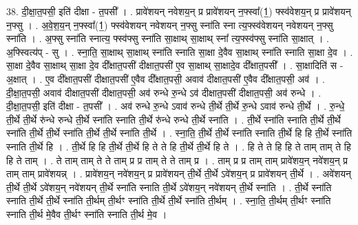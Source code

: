 \documentclass[17pt]{extarticle}
\begin{document}
38. दी॒क्षा॒त॒पसी॒ इति॑ दीक्षा - त॒पसी᳚ । . प्रावे॑शयन् नवेशय॒न् प्र प्रावे॑शयन् न॒फ्स्वा᳚(1॒) फ्स्व॑वेशय॒न् प्र प्रावे॑शयन् न॒फ्सु । . अ॒वे॒श॒य॒न् न॒फ्स्वा᳚(1॒) फ्स्व॑वेशयन्  नवेशयन् न॒फ्सु स्ना॑ति स्ना त्य॒फ्स्व॑वेशयन् नवेशयन् न॒फ्सु स्ना॑ति । . अ॒फ्सु स्ना॑ति स्नात्य॒ फ्स्व॑फ्सु स्ना॑ति सा॒क्षाथ् सा॒क्षाथ् स्ना᳚ त्य॒फ्स्व॑फ्सु स्ना॑ति सा॒क्षात् । . अ॒फ्स्वित्य॑प् - सु । . स्ना॒ति॒ सा॒क्षाथ् सा॒क्षाथ् स्ना॑ति स्नाति सा॒क्षा दे॒वैव सा॒क्षाथ् स्ना॑ति स्नाति सा॒क्षा दे॒व । . सा॒क्षा दे॒वैव सा॒क्षाथ् सा॒क्षा दे॒व दी᳚क्षात॒पसी॑ दीक्षात॒पसी॑ ए॒व सा॒क्षाथ् सा॒क्षादे॒व दी᳚क्षात॒पसी᳚ । . सा॒क्षादिति॑ स - अ॒क्षात् । . ए॒व दी᳚क्षात॒पसी॑ दीक्षात॒पसी॑ ए॒वैव दी᳚क्षात॒पसी॒ अवाव॑ दीक्षात॒पसी॑ ए॒वैव दी᳚क्षात॒पसी॒ अव॑ । . दी॒क्षा॒त॒पसी॒ अवाव॑ दीक्षात॒पसी॑ दीक्षात॒पसी॒ अव॑ रुन्धे रु॒न्धे ऽव॑ दीक्षात॒पसी॑ दीक्षात॒पसी॒ अव॑ रुन्धे । . दी॒क्षा॒त॒पसी॒ इति॑ दीक्षा - त॒पसी᳚ । . अव॑ रुन्धे रु॒न्धे ऽवाव॑ रुन्धे ती॒र्थे ती॒र्थे रु॒न्धे ऽवाव॑ रुन्धे ती॒र्थे । . रु॒न्धे॒ ती॒र्थे ती॒र्थे रु॑न्धे रुन्धे ती॒र्थे स्ना॑ति स्नाति ती॒र्थे रु॑न्धे रुन्धे ती॒र्थे स्ना॑ति । . ती॒र्थे स्ना॑ति स्नाति ती॒र्थे ती॒र्थे स्ना॑ति ती॒र्थे ती॒र्थे स्ना॑ति ती॒र्थे ती॒र्थे स्ना॑ति ती॒र्थे । . स्ना॒ति॒ ती॒र्थे ती॒र्थे स्ना॑ति स्नाति ती॒र्थे हि हि ती॒र्थे स्ना॑ति स्नाति ती॒र्थे हि । . ती॒र्थे हि हि ती॒र्थे ती॒र्थे हि ते ते हि ती॒र्थे ती॒र्थे हि ते । . हि ते ते हि हि ते ताम् ताम् ते हि हि ते ताम् । . ते ताम् ताम् ते ते ताम् प्र प्र ताम् ते ते ताम् प्र । . ताम् प्र प्र ताम् ताम् प्रावे॑शय॒न् नवे॑शय॒न् प्र ताम् ताम् प्रावे॑शयन्न् । . प्रावे॑शय॒न् नवे॑शय॒न् प्र प्रावे॑शयन् ती॒र्थे ती॒र्थे ऽवे॑शय॒न् प्र प्रावे॑शयन् ती॒र्थे । . अवे॑शयन् ती॒र्थे ती॒र्थे ऽवे॑शय॒न् नवे॑शयन् ती॒र्थे स्ना॑ति स्नाति ती॒र्थे ऽवे॑शय॒न् नवे॑शयन् ती॒र्थे स्ना॑ति । . ती॒र्थे स्ना॑ति स्नाति ती॒र्थे ती॒र्थे स्ना॑ति ती॒र्थम् ती॒र्थꣳ स्ना॑ति ती॒र्थे ती॒र्थे स्ना॑ति ती॒र्थम् । . स्ना॒ति॒ ती॒र्थम् ती॒र्थꣳ स्ना॑ति स्नाति ती॒र्थ मे॒वैव ती॒र्थꣳ स्ना॑ति स्नाति ती॒र्थ मे॒व । \newline
\pagebreak
{}
\end{document}
